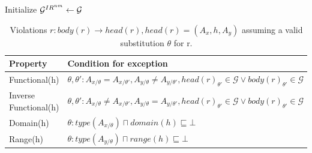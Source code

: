 \documentclass[a4paper,UKenglish,cleveref, autoref, thm-restate]{tgdk-v2021}
\begin{document}
\begin{algorithm}[t]
\SetAlgoLined
\DontPrintSemicolon
{}


\BlankLine
Initialize $\mathcal{G}^{IR^{nm}} \leftarrow \mathcal{G}$\;
\BlankLine

\Return{$\GIRnm$}

\caption{Materialize $\mathcal{G}^{IR^{nm}}$}
\label{alg:materialize}
\end{algorithm}
%
\begin{table}[t]
    \centering
    \caption{Violations  $r: body(r)\rightarrow head(r),head(r) =(A_x, h, A_y)$ assuming a valid substitution $\theta$ for r.}
    \begin{tabular}{|l|l|}
        \hline
        \textbf{Property} & \textbf{Condition for exception} \\
        \hline
        Functional(h)  & $\theta,\theta':A_{x/\theta} =A_{x/\theta'},A_{y/\theta} \neq A_{y/\theta'}, head(r)_{\theta'} \in \mathcal{G} \lor body(r)_{\theta'} \in \mathcal{G}$ \\
        \hline
        Inverse Functional(h) & $\theta,\theta':A_{x/\theta} \neq A_{x/\theta'},A_{y/\theta} = A_{y/\theta'}, head(r)_{\theta'} \in \mathcal{G} \lor body(r)_{\theta'} \in \mathcal{G}$ \\
        \hline
        Domain(h) & $\theta: type(A_{x/\theta}) \sqcap domain(h) \sqsubseteq \bot$ \\
        \hline
        Range(h) & $\theta: type(A_{y/\theta}) \sqcap range(h) \sqsubseteq \bot$  \\
        \hline
    \end{tabular}   
    
    \label{tab:ijp}
\end{table}
\end{document}
